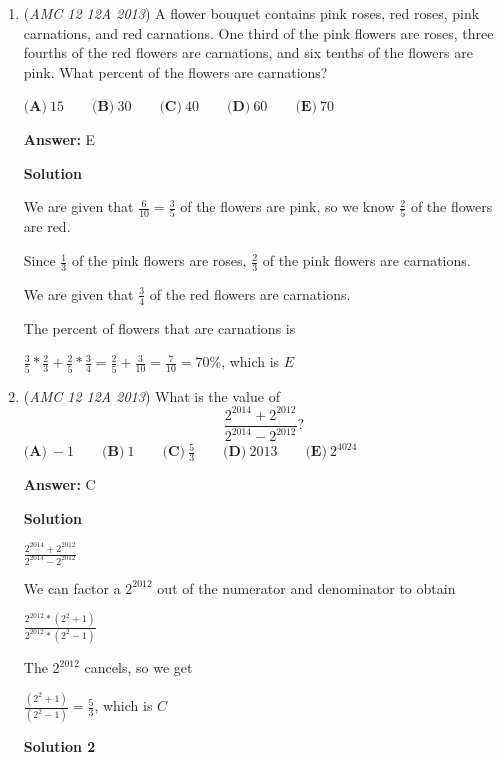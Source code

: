 \begin{enumerate}
 Therefore, the total runs by the opponent is $(2+4+6+8+10)+(1+2+3+4+5) = 45$, which is $C$



	\item (\textit{AMC 12 12A 2013}) A flower bouquet contains pink roses, red roses, pink carnations, and red carnations. One third of the pink flowers are roses, three fourths of the red flowers are carnations, and six tenths of the flowers are pink. What percent of the flowers are carnations?


 $\textbf{(A)}\ 15\qquad\textbf{(B)}\ 30\qquad\textbf{(C)}\ 40\qquad\textbf{(D)}\ 60\qquad\textbf{(E)}\ 70$

 \textbf{Answer: }E



\textbf{Solution}

We are given that $\frac{6}{10} = \frac{3}{5}$ of the flowers are pink, so we know $\frac{2}{5}$ of the flowers are red.

 Since $\frac{1}{3}$ of the pink flowers are roses, $\frac{2}{3}$ of the pink flowers are carnations.

 We are given that $\frac{3}{4}$ of the red flowers are carnations.

 The percent of flowers that are carnations is 

 $\frac{3}{5} * \frac{2}{3} + \frac{2}{5} * \frac{3}{4} = \frac{2}{5} + \frac{3}{10} = \frac{7}{10} = 70\%$, which is $E$



	\item (\textit{AMC 12 12A 2013}) What is the value of 
 \[\frac{2^{2014}+2^{2012}}{2^{2014}-2^{2012}}?\]
$\textbf{(A)}\ -1\qquad\textbf{(B)}\ 1\qquad\textbf{(C)}\ \frac{5}{3}\qquad\textbf{(D)}\ 2013\qquad\textbf{(E)}\ 2^{4024}$

 \textbf{Answer: }C



\textbf{Solution}

$\frac{2^{2014}+2^{2012}}{2^{2014}-2^{2012}}$

 We can factor a ${2^{2012}}$ out of the numerator and denominator to obtain

 $\frac{2^{2012}*(2^2+1)}{2^{2012}*(2^2-1)}$

 The ${2^{2012}}$ cancels, so we get 

 $\frac{(2^2+1)}{(2^2-1)}=\frac{5}{3}$, which is $C$




\textbf{Solution 2}


\end{enumerate}
